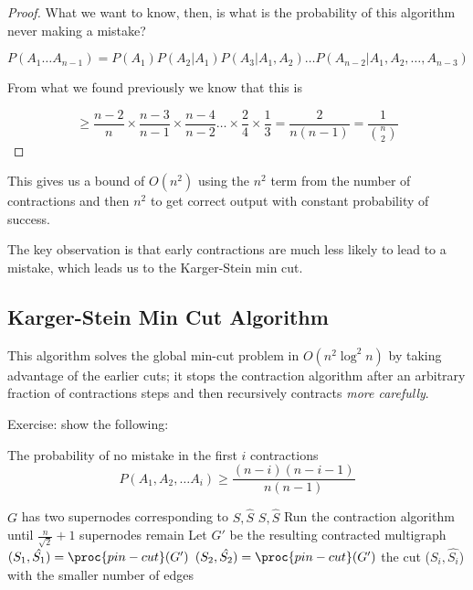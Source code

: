 \documentclass[../notes.tex]{subfiles}
\begin{document}
\begin{lemma}
\begin{proof}
  What we want to know, then, is what is the probability of this algorithm never making a mistake?


  \begin{equation}
    P(A_1 \ldots A_{n-1}) = P(A_1)P(A_2 | A_1) P(A_3 | A_1, A_2) \ldots P(A_{n-2} | A_1, A_2, \ldots, A_{n-3})
  \end{equation}

  From what we found previously we know that this is 

  \begin{equation}
    \ge \frac{n-2}{n} \times \frac{n-3}{n-1} \times \frac{n-4}{n-2} \ldots \times \frac{2}{4} \times \frac{1}{3}  = \frac{2}{n(n-1)} =  \frac{1}{\binom{n}{2}}
  \end{equation}

  \end{proof}

  This gives us a bound of $ O(n^2) $ using the $ n^2 $ term from the number of contractions and then $ n^2 $ to get correct output with constant probability of success.

\end{lemma}


The key observation is that early contractions are much less likely to lead to a mistake, which leads us to the Karger-Stein min cut. 

\subsection{Karger-Stein Min Cut Algorithm}

This algorithm solves the global min-cut problem in $ O(n^2 \log^2 n) $ by taking advantage of the earlier cuts; it stops the contraction algorithm after an arbitrary fraction of contractions steps and then recursively contracts \textit{more carefully}.

Exercise: show the following:


The probability of no mistake in the first $ i $ contractions
\begin{equation}
  P(A_1, A_2, \ldots A_i) \ge \frac{(n-i)(n-i-1)}{n(n-1)}
\end{equation}


\begin{codebox}
\li \If $ G $ has two supernodes corresponding to $ S, \hat{S} $
\li   \Return $ S, \hat{S} $\End 
\li Run the contraction algorithm until $ \frac{n}{\sqrt{2} } + 1 $ supernodes remain
\li Let $ G' $ be the resulting contracted multigraph
\li $ (S_1, \hat{S_1}) = \proc{pin-cut}(G') $
\li $ (S_2, \hat{S_2}) = \proc{pin-cut}(G') $
\li \Return the cut ($ S_i, \hat{S_i}$) with the smaller number of edges
\end{codebox}
\end{document}

